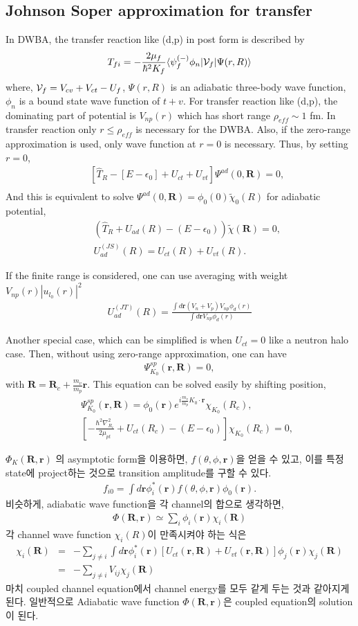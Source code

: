 \documentclass[11pt]{book}
\def\bm{\boldsymbol}
\def\vr{{\bm r}}
\def\vR{{\bm R}}
\def\la{\langle}
\def\ra{\rangle}
\newcommand{\bea}{\begin{eqnarray}}
\newcommand{\eea}{\end{eqnarray}}
\newcommand{\no}{\nonumber \\}
\begin{document}
\subsection{Johnson Soper approximation for transfer} 
In DWBA, the transfer reaction like (d,p) in post form is described by 
\bea 
T_{fi}=-\frac{2\mu_f}{\hbar^2 K_f}\la \psi_f^{(-)}\phi_{n}|{\cal V}_f|\Psi(r,R)\ra 
\eea 
where, ${\cal V}_f=V_{cv}+V_{ct}-U_f$, $\Psi(r,R)$ is an adiabatic three-body wave function,
$\phi_n$ is a bound state wave function of $t+v$. 
For transfer reaction like (d,p), the dominating part of potential is $V_{np}(r)$  
which has short range $\rho_{eff}\sim 1$ fm. In transfer reaction only $r\le \rho_{eff}$
is necessary for the DWBA. Also, if the zero-range approximation is used, 
only wave function at $r=0$ is necessary. Thus, by setting $r=0$,  
\bea 
& &[\hat{T}_R-[E-\epsilon_0]+U_{ct}+U_{vt}]\Psi^{ad}(0,\vR)=0,\no
\eea 
And this is equivalent to solve $\Psi^{ad}(0,\vR)=\phi_0(0)\tilde{\chi}_0(R) $ for
adiabatic potential,
\bea 
& &(\hat{T}_R+U_{ad}(R)-(E-\epsilon_0))\tilde{\chi}(\vR)=0, \no 
& & U_{ad}^{(JS)}(R)=U_{ct}(R)+U_{vt}(R).
\eea 

If the finite range is considered, one can use averaging with weight $V_{np}(r)|u_{l_0}(r)|^2$
\bea 
U_{ad}^{(JT)}(R)=\frac{\int d\vr ( V_{n}+V_{p}) V_{np}\phi_d(r) }{\int d\vr V_{np}\phi_d(r)}
\eea 
 
Another special case, which can be simplified is when $U_{ct}=0$ like a neutron halo case. 
Then, without using zero-range approximation, one can have
\bea 
[-\frac{\hbar^2\nabla^2_R}{2\mu_{pt}}+U_{ct}(R_c)-(E-\epsilon_0)]\Psi^{sp}_{K_0}(\vr,\vR)=0,
\eea  
with $\vR=\vR_c+\frac{m_v}{m_p}\vr$. This equation can be solved easily by 
shifting position, 
\bea 
& &\Psi^{sp}_{K_0}(\vr,\vR)=\phi_0(\vr)e^{i\frac{m_v}{m_p}K_0\cdot\vr}\chi_{K_0}(R_c),\no 
& &[-\frac{\hbar^2\nabla^2_{R_c}}{2\mu_{pt}}+U_{ct}(R_c)-(E-\epsilon_0)]\chi_{K_0}(R_c) =0,
\eea 
 
 
$\Phi_K(\vR,\vr)$ 의 asymptotic form을 이용하면, $f(\theta,\phi,\vr)$을 얻을 수 있고,
이를 특정 state에 project하는 것으로 transition amplitude를 구할 수 있다. 
\bea 
f_{i0}=\int d\vr \phi^*_i(\vr)f(\theta,\phi,\vr)\phi_0(\vr).
\eea 
비슷하게, adiabatic wave function을 각 channel의 합으로 생각하면,
\bea 
\Phi(\vR,\vr)\simeq \sum_i \phi_i(\vr)\chi_i(\vR) 
\eea 
각 channel wave function $\chi_i(R)$이 만족시켜야 하는 식은 
\bea
[\hat{T}_R+\epsilon_0-E_K]\chi_i(\vR)
&=&-\sum_{j\neq i} \int d\vr \phi^*_i(\vr)   
[U_{ct}(\vr,{\bm R})+U_{vt}(\vr,{\bm R})]\phi_j(\vr)\chi_j(\vR) \no 
&=&-\sum_{j\neq i} V_{ij}\chi_j(\vR) 
\eea 
마치 coupled channel equation에서 channel energy를 모두 같게 두는 것과 같아지게 된다. 
일반적으로 Adiabatic wave function $\Phi(\vR,\vr)$은 coupled equation의 solution이 된다.
\end{document}
